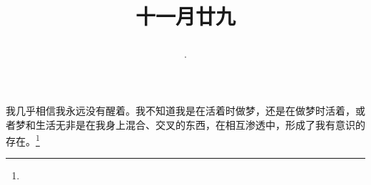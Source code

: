 \title{\date[d=10,m=1,y=2024][year:cn-y,年,month:cn,day:cn,日,·,weekday]·十一月廿九 }
我几乎相信我永远没有醒着。我不知道我是在活着时做梦，还是在做梦时活着，或者梦和生活无非是在我身上混合、交叉的东西，在相互渗透中，形成了我有意识的存在。\footnote{ }

